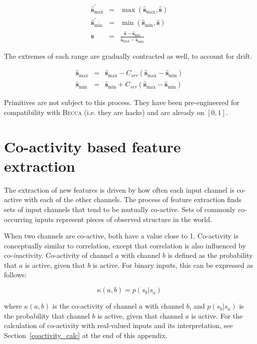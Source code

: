 \begin{eqnarray}
\hat{\mathbf{s}}_{\max}^{\prime} &=& \max \left ( \hat{\mathbf{s}}_{\max}, \hat{\mathbf{s}} \right ) \\
\hat{\mathbf{s}}_{\min}^{\prime} &=& \min \left ( \hat{\mathbf{s}}_{\min}, \hat{\mathbf{s}} \right ) \\
\mathbf{s} &=& \frac{\hat{\mathbf{s}} -  \hat{\mathbf{s}}_{\min}}{\hat{\mathbf{s}}_{\max} -  \hat{\mathbf{s}}_{\min}}
\end{eqnarray}

The extremes of each range are gradually contracted as well, to account for drift.

\begin{eqnarray}
\hat{\mathbf{s}}_{\max} &=& \hat{\mathbf{s}}_{\max} - C_{srr} ( \hat{\mathbf{s}}_{\max} -  \hat{\mathbf{s}}_{\min}) \\
\hat{\mathbf{s}}_{\min} &=& \hat{\mathbf{s}}_{\min} + C_{srr} (\hat{\mathbf{s}}_{\max} -  \hat{\mathbf{s}}_{\min}) 
\end{eqnarray}

Primitives are not subject to this process. They have been pre-engineered for compatibility with \textsc{Becca} (i.e. they are hacks) and are already on $[0, 1]$.

\section{Co-activity based feature extraction}
The extraction of new features is driven by how often each input channel is co-active with each of the other channels. The process of feature extraction finds sets of input channels that tend to be mutually co-active. Sets of commonly co-occurring inputs represent pieces of observed structure in the world.

When two channels are co-active, both have a value close to 1. Co-activity is conceptually similar to correlation, except that correlation is also influenced by co-{\em in}activity. Co-activity of channel $a$ with channel $b$ is defined as the probability that $a$ is active, given that $b$ is active. For binary inputs, this can be expressed as follows:

\begin{equation}
\kappa(a,b) = p(s_b|s_a)
\label{coactivity_def}
\end{equation}

where $\kappa(a,b)$ is the co-activity of channel $a$ with channel $b$, and $p(s_b|s_a)$ is the probability that channel $b$ is active, given that channel $a$ is active. For the calculation of co-activity with real-valued inputs and its interpretation, see Section~\ref{coactivity_calc} at the end of this appendix. 

